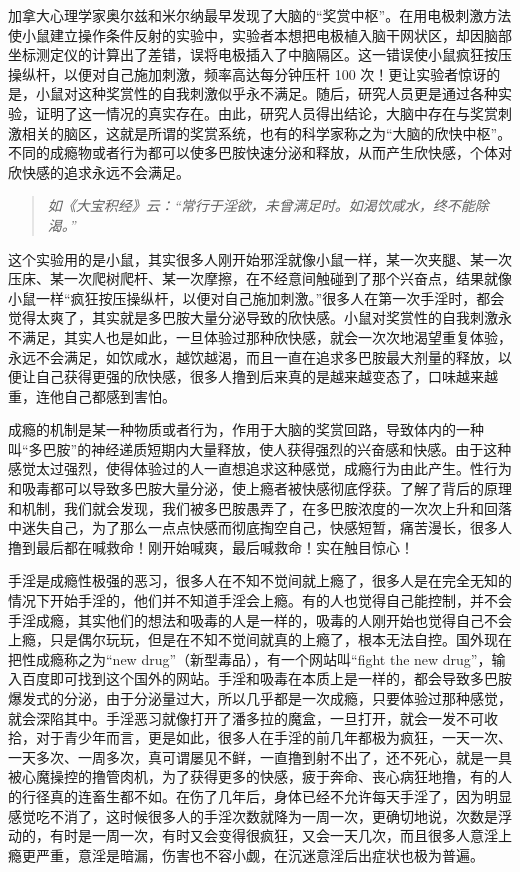 加拿大心理学家奥尔兹和米尔纳最早发现了大脑的“奖赏中枢”。在用电极刺激方法使小鼠建立操作条件反射的实验中，实验者本想把电极植入脑干网状区，却因脑部坐标测定仪的计算出了差错，误将电极插入了中脑隔区。这一错误使小鼠疯狂按压操纵杆，以便对自己施加刺激，频率高达每分钟压杆 100 次！更让实验者惊讶的是，小鼠对这种奖赏性的自我刺激似乎永不满足。随后，研究人员更是通过各种实验，证明了这一情况的真实存在。由此，研究人员得出结论，大脑中存在与奖赏刺激相关的脑区，这就是所谓的奖赏系统，也有的科学家称之为“大脑的欣快中枢”。不同的成瘾物或者行为都可以使多巴胺快速分泌和释放，从而产生欣快感，个体对欣快感的追求永远不会满足。

\begin{quote}\it
    如《大宝积经》云：“常行于淫欲，未曾满足时。如渴饮咸水，终不能除渴。”
\end{quote}

这个实验用的是小鼠，其实很多人刚开始邪淫就像小鼠一样，某一次夹腿、某一次压床、某一次爬树爬杆、某一次摩擦，在不经意间触碰到了那个兴奋点，结果就像小鼠一样“疯狂按压操纵杆，以便对自己施加刺激。”很多人在第一次手淫时，都会觉得太爽了，其实就是多巴胺大量分泌导致的欣快感。小鼠对奖赏性的自我刺激永不满足，其实人也是如此，一旦体验过那种欣快感，就会一次次地渴望重复体验，永远不会满足，如饮咸水，越饮越渴，而且一直在追求多巴胺最大剂量的释放，以便让自己获得更强的欣快感，很多人撸到后来真的是越来越变态了，口味越来越重，连他自己都感到害怕。

成瘾的机制是某一种物质或者行为，作用于大脑的奖赏回路，导致体内的一种叫“多巴胺”的神经递质短期内大量释放，使人获得强烈的兴奋感和快感。由于这种感觉太过强烈，使得体验过的人一直想追求这种感觉，成瘾行为由此产生。性行为和吸毒都可以导致多巴胺大量分泌，使上瘾者被快感彻底俘获。了解了背后的原理和机制，我们就会发现，我们被多巴胺愚弄了，在多巴胺浓度的一次次上升和回落中迷失自己，为了那么一点点快感而彻底掏空自己，快感短暂，痛苦漫长，很多人撸到最后都在喊救命！刚开始喊爽，最后喊救命！实在触目惊心！

手淫是成瘾性极强的恶习，很多人在不知不觉间就上瘾了，很多人是在完全无知的情况下开始手淫的，他们并不知道手淫会上瘾。有的人也觉得自己能控制，并不会手淫成瘾，其实他们的想法和吸毒的人是一样的，吸毒的人刚开始也觉得自己不会上瘾，只是偶尔玩玩，但是在不知不觉间就真的上瘾了，根本无法自控。国外现在把性成瘾称之为“new drug”（新型毒品），有一个网站叫“fight the new drug”，输入百度即可找到这个国外的网站。手淫和吸毒在本质上是一样的，都会导致多巴胺爆发式的分泌，由于分泌量过大，所以几乎都是一次成瘾，只要体验过那种感觉，就会深陷其中。手淫恶习就像打开了潘多拉的魔盒，一旦打开，就会一发不可收拾，对于青少年而言，更是如此，很多人在手淫的前几年都极为疯狂，一天一次、一天多次、一周多次，真可谓屡见不鲜，一直撸到射不出了，还不死心，就是一具被心魔操控的撸管肉机，为了获得更多的快感，疲于奔命、丧心病狂地撸，有的人的行径真的连畜生都不如。在伤了几年后，身体已经不允许每天手淫了，因为明显感觉吃不消了，这时候很多人的手淫次数就降为一周一次，更确切地说，次数是浮动的，有时是一周一次，有时又会变得很疯狂，又会一天几次，而且很多人意淫上瘾更严重，意淫是暗漏，伤害也不容小觑，在沉迷意淫后出症状也极为普遍。

